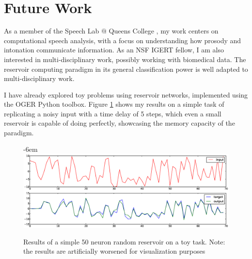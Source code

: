 \documentclass[12pt,oneside]{CUNY_CS_PhD}
\begin{document}

\section{Future Work}
As a member of the Speech Lab $@$ Queens College \cite{slqc}, my work centers on computational speech analysis, with a focus on understanding how prosody and intonation communicate information. As an NSF IGERT \cite{igert} fellow, I am also interested in multi-disciplinary work, possibly working with biomedical data. The reservoir computing paradigm in its general classification power is well adapted to multi-disciplinary work.

 I have already explored toy problems using reservoir networks, implemented using the OGER \cite{oger} Python toolbox. Figure \ref{fig:myres} shows my results on a simple task of replicating a noisy input with a time delay of 5 steps, which even a small reservoir is capable of doing perfectly, showcasing the memory capacity of the paradigm.
\begin{figure}[t]
\leftskip-6em
\includegraphics[width=\paperwidth]{pictures/my-res1.eps}
\caption{Results of a simple 50 neuron random reservoir on a toy task. Note: the results are artificially worsened for visualization
purposes}
\label{fig:myres}
\end{figure}\\


\backmatter



\end{document}
